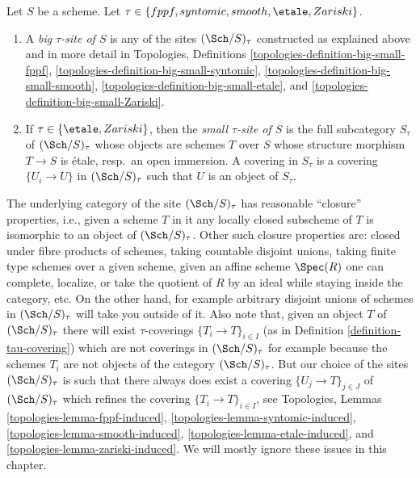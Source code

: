 \begin{definition}
\label{definition-tau-site}
Let $S$ be a scheme.
Let $\tau \in \{fppf, syntomic, smooth, \etale, \linebreak[0] Zariski\}$.
\begin{enumerate}
\item A {\it big $\tau$-site of $S$} is any of the sites
$(\Sch/S)_\tau$ constructed as explained above and in more detail in
Topologies, Definitions
\ref{topologies-definition-big-small-fppf},
\ref{topologies-definition-big-small-syntomic},
\ref{topologies-definition-big-small-smooth},
\ref{topologies-definition-big-small-etale}, and
\ref{topologies-definition-big-small-Zariski}.
\item If $\tau \in \{\etale, Zariski\}$, then the
{\it small $\tau$-site of $S$}
is the full subcategory $S_\tau$ of $(\Sch/S)_\tau$ whose objects
are schemes $T$ over $S$ whose structure morphism $T \to S$ is \'etale,
resp.\ an open immersion. A covering in $S_\tau$ is a covering
$\{U_i \to U\}$ in $(\Sch/S)_\tau$
such that $U$ is an object of $S_\tau$.
\end{enumerate}
\end{definition}

\noindent
The underlying category of the site $(\Sch/S)_\tau$ has reasonable
``closure'' properties, i.e., given a scheme $T$ in it any locally closed
subscheme of $T$ is isomorphic to an object of $(\Sch/S)_\tau$.
Other such closure properties are: closed under fibre products of schemes,
taking countable disjoint unions,
taking finite type schemes over a given scheme, given an affine scheme
$\Spec(R)$ one can complete, localize, or take the quotient of $R$
by an ideal while staying inside the category, etc.
On the other hand, for example arbitrary disjoint unions
of schemes in $(\Sch/S)_\tau$ will take you outside of it.
Also note that, given an object $T$ of $(\Sch/S)_\tau$ there will exist
$\tau$-coverings $\{T_i \to T\}_{i \in I}$ (as in
Definition \ref{definition-tau-covering})
which are not coverings in $(\Sch/S)_\tau$ for example
because the schemes $T_i$ are not objects of the category
$(\Sch/S)_\tau$. But our choice of the sites $(\Sch/S)_\tau$
is such that there always does exist
a covering $\{U_j \to T\}_{j \in J}$ of $(\Sch/S)_\tau$ which refines
the covering $\{T_i \to T\}_{i \in I}$, see
Topologies, Lemmas
\ref{topologies-lemma-fppf-induced},
\ref{topologies-lemma-syntomic-induced},
\ref{topologies-lemma-smooth-induced},
\ref{topologies-lemma-etale-induced}, and
\ref{topologies-lemma-zariski-induced}.
We will mostly ignore these issues in this chapter.

